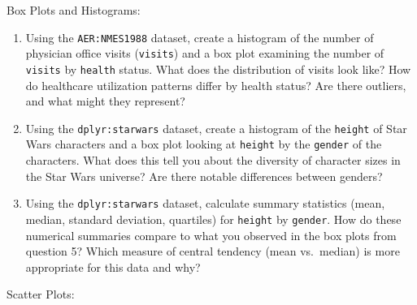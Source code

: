 \documentclass[
  letterpaper,
]{book}
\begin{document}
Box Plots and Histograms:

\begin{enumerate}
\def\labelenumi{\arabic{enumi}.}
\setcounter{enumi}{4}
\item
  Using the \texttt{AER:NMES1988} dataset, create a histogram of the
  number of physician office visits (\texttt{visits}) and a box plot
  examining the number of \texttt{visits} by \texttt{health} status.
  What does the distribution of visits look like? How do healthcare
  utilization patterns differ by health status? Are there outliers, and
  what might they represent?
\item
  Using the \texttt{dplyr:starwars} dataset, create a histogram of the
  \texttt{height} of Star Wars characters and a box plot looking at
  \texttt{height} by the \texttt{gender} of the characters. What does
  this tell you about the diversity of character sizes in the Star Wars
  universe? Are there notable differences between genders?
\item
  Using the \texttt{dplyr:starwars} dataset, calculate summary
  statistics (mean, median, standard deviation, quartiles) for
  \texttt{height} by \texttt{gender}. How do these numerical summaries
  compare to what you observed in the box plots from question 5? Which
  measure of central tendency (mean vs.~median) is more appropriate for
  this data and why?
\end{enumerate}

Scatter Plots:
\end{document}
